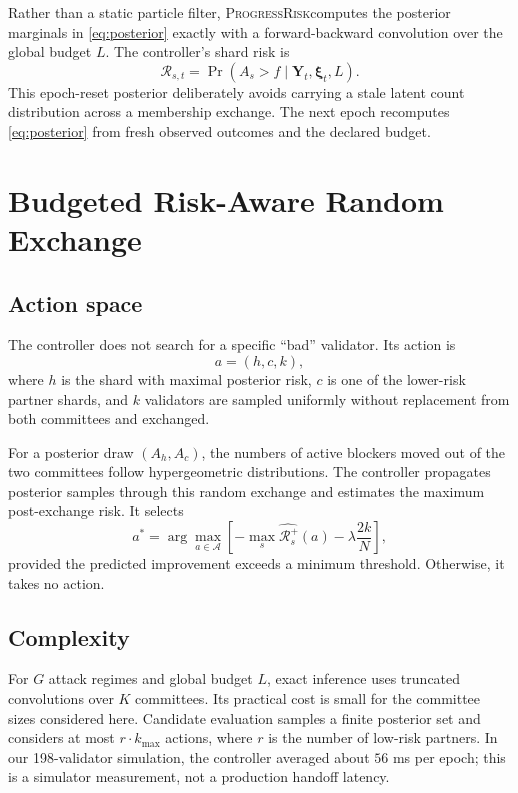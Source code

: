 \documentclass[10pt,conference]{IEEEtran}
\newcommand{\risk}{\mathcal{R}}
\newcommand{\sysname}{\textsc{ProgressRisk}}
\begin{document}
Rather than a static particle filter, \sysname computes the posterior marginals in \eqref{eq:posterior} exactly with a forward-backward convolution over the global budget $L$. The controller's shard risk is
\begin{equation}
\risk_{s,t}=\Pr(A_s>f\mid\mathbf{Y}_t,\boldsymbol{\xi}_t,L).
\label{eq:risk}
\end{equation}
This epoch-reset posterior deliberately avoids carrying a stale latent count distribution across a membership exchange. The next epoch recomputes \eqref{eq:posterior} from fresh observed outcomes and the declared budget.

\section{Budgeted Risk-Aware Random Exchange}

\subsection{Action space}

The controller does not search for a specific ``bad'' validator. Its action is
\begin{equation}
a=(h,c,k),
\end{equation}
where $h$ is the shard with maximal posterior risk, $c$ is one of the lower-risk partner shards, and $k$ validators are sampled uniformly without replacement from both committees and exchanged.

For a posterior draw $(A_h,A_c)$, the numbers of active blockers moved out of the two committees follow hypergeometric distributions. The controller propagates posterior samples through this random exchange and estimates the maximum post-exchange risk. It selects
\begin{equation}
a^*=\arg\max_{a\in\mathcal{A}}
\left[-\widehat{\max_s\risk_s^+(a)}-\lambda\frac{2k}{N}\right],
\label{eq:utility}
\end{equation}
provided the predicted improvement exceeds a minimum threshold. Otherwise, it takes no action.

\subsection{Complexity}

For $G$ attack regimes and global budget $L$, exact inference uses truncated convolutions over $K$ committees. Its practical cost is small for the committee sizes considered here. Candidate evaluation samples a finite posterior set and considers at most $r\cdot k_{\max}$ actions, where $r$ is the number of low-risk partners. In our 198-validator simulation, the controller averaged about $56$ ms per epoch; this is a simulator measurement, not a production handoff latency.
\end{document}
